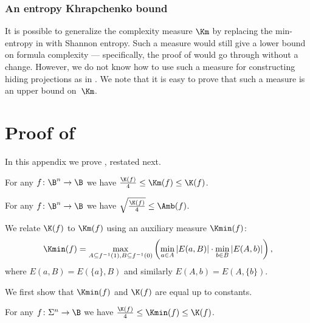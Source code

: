 %
%
\subsubsection{An entropy Khrapchenko bound}  %

It is possible to generalize the complexity measure $\Km$ by replacing
the min-entropy in  
with Shannon entropy.
Such a measure would still %
give a lower bound on %
formula complexity --- specifically,
the proof of  
would go through
without a change. However, we do not know how to use such a measure
for constructing hiding projections as in 
.
We note that it is easy to prove that such a measure is an upper bound
on~$\Km$.

\section{\label{sec:K-Km}Proof of 
  }

In this appendix we prove 
  , restated next. 
\begin{restated}{}
For any $f\colon\B^{n}\to\B$ we have $\tfrac{\K(f)}{4}\le\Km(f)\le\K(f)$. 
\end{restated}

\begin{restated}{}
For any $f\colon\B^{n}\to\B$ we have $\sqrt{\tfrac{\K(f)}{4}}\le\Amb(f)$. 
\end{restated}

We relate $\K(f)$ to $\Km(f)$ using an auxiliary measure $\Kmin(f)$:
\[
\Kmin(f)=\max_{A\subseteq f^{-1}(1),B\subseteq f^{-1}(0)}\left(\min_{a\in A}{|E(a,B)|}\cdot\min_{b\in B}{|E(A,b)|}\right),
\]
where $E(a,B)=E(\{a\},B)$ and similarly $E(A,b)=E(A,\{b\})$.

We first show that $\Kmin(f)$ and $\K(f)$ are equal up to constants.
\begin{claim}
\label{claim:K-Kmin} For any $f\colon\Sigma^{n}\to\B$ we have $\tfrac{\K(f)}{4}\le\Kmin(f)\le\K(f)$. 
\end{claim}

